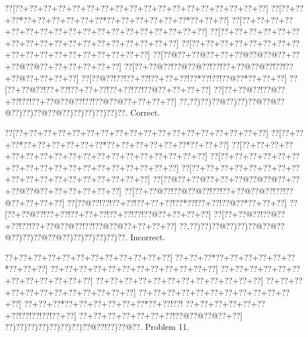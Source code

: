 \documentclass[a5paper]{article}
\begin{document}
\begin{center}
{\goo
\0??[\0??+\0??+\0??+\0??+\0??+\0??+\0??+\0??+\0??+\0??+\0??+\0??+\0??+\0??+\0??+\0??+\0??+\0??]
\0??[\0??+\0??+\0??*\0??+\0??+\0??+\0??+\0??+\0??*\0??+\0??+\0??+\0??+\0??+\0??*\0??+\0??+\0??]
\0??[\0??+\0??+\0??+\0??+\0??+\0??+\0??+\0??+\0??+\0??+\0??+\0??+\0??+\0??+\0??+\0??+\0??+\0??]
\0??[\0??+\0??+\0??+\0??+\0??+\0??+\0??+\0??+\0??+\0??+\0??+\0??+\0??+\0??+\0??+\0??+\0??+\0??]
\0??[\0??+\0??+\0??+\0??+\0??+\0??+\0??+\0??+\0??+\0??+\0??+\0??+\0??+\0??+\0??+\0??+\0??+\0??]
\0??[\0??@\0??+\0??@\0??+\0??+\0??@\0??@\0??@\0??+\0??+\0??@\0??@\0??+\0??+\0??+\0??+\0??+\0??]
\0??[\0??+\0??@\0??!\0??@\0??@\0??!\0??!\0??+\0??@\0??@\0??!\0??!\0??+\0??@\0??+\0??+\0??+\0??]
\0??[\0??@\0??!\0??!\0??+\0??!\0??+\0??+\0??!\0??*\0??!\0??!\0??@\0??*\0??+\0??+\0??]
\0??[\0??+\0??@\0??!\0??+\0??!\0??+\0??+\0??!\0??+\0??!\0??!\0??@\0??+\0??+\0??+\0??]
\0??[\0??+\0??@\0??!\0??@\0??+\0??!\0??!\0??+\0??@\0??@\0??!\0??!\0??@\0??@\0??+\0??+\0??+\0??]
\0??,\0??)\0??)\0??@\0??)\0??)\0??@\0??@\0??@\0??)\0??)\0??@\0??@\0??)\0??)\0??)\0??)\0??)\0??.
}
Correct. 

\end{center}
\begin{center}
{\goo
\0??[\0??+\0??+\0??+\0??+\0??+\0??+\0??+\0??+\0??+\0??+\0??+\0??+\0??+\0??+\0??+\0??+\0??+\0??]
\0??[\0??+\0??+\0??*\0??+\0??+\0??+\0??+\0??+\0??*\0??+\0??+\0??+\0??+\0??+\0??*\0??+\0??+\0??]
\0??[\0??+\0??+\0??+\0??+\0??+\0??+\0??+\0??+\0??+\0??+\0??+\0??+\0??+\0??+\0??+\0??+\0??+\0??]
\0??[\0??+\0??+\0??+\0??+\0??+\0??+\0??+\0??+\0??+\0??+\0??+\0??+\0??+\0??+\0??+\0??+\0??+\0??]
\0??[\0??+\0??+\0??+\0??+\0??+\0??+\0??+\0??+\0??+\0??+\0??+\0??+\0??+\0??+\0??+\0??+\0??+\0??]
\0??[\0??@\0??+\0??@\0??+\0??+\0??@\0??@\0??@\0??+\0??+\0??@\0??@\0??+\0??+\0??+\0??+\0??+\0??]
\0??[\0??+\0??@\0??!\0??@\0??@\0??!\0??!\0??+\0??@\0??@\0??!\0??!\0??@\0??+\0??+\0??+\0??]
\0??[\0??@\0??!\0??!\0??+\0??!\0??+\0??+\0??!\0??*\0??!\0??+\0??!\0??@\0??*\0??+\0??+\0??]
\0??[\0??+\0??@\0??!\0??+\0??!\0??+\0??+\0??!\0??+\0??!\0??!\0??@\0??+\0??+\0??+\0??]
\0??[\0??+\0??@\0??!\0??@\0??+\0??!\0??!\0??+\0??@\0??@\0??!\0??!\0??@\0??@\0??+\0??+\0??+\0??]
\0??,\0??)\0??)\0??@\0??)\0??)\0??@\0??@\0??@\0??)\0??)\0??@\0??@\0??)\0??)\0??)\0??)\0??)\0??.
}
Incorrect. 

\end{center}
\newpage
\begin{center}
{\goo
\0??+\0??+\0??+\0??+\0??+\0??+\0??+\0??+\0??+\0??+\0??+\0??]
\0??+\0??+\0??*\0??+\0??+\0??+\0??+\0??+\0??*\0??+\0??+\0??]
\0??+\0??+\0??+\0??+\0??+\0??+\0??+\0??+\0??+\0??+\0??+\0??]
\0??+\0??+\0??+\0??+\0??+\0??+\0??+\0??+\0??+\0??+\0??+\0??]
\0??+\0??+\0??+\0??+\0??+\0??+\0??+\0??+\0??+\0??+\0??+\0??]
\0??+\0??+\0??+\0??+\0??+\0??+\0??+\0??+\0??+\0??+\0??+\0??]
\0??+\0??+\0??+\0??+\0??+\0??+\0??+\0??+\0??+\0??+\0??+\0??]
\0??+\0??+\0??*\0??+\0??+\0??+\0??+\0??+\0??*\0??+\0??!\0??!
\0??+\0??+\0??+\0??+\0??+\0??+\0??!\0??!\0??!\0??!\0??+\0??]
\0??+\0??+\0??+\0??+\0??+\0??+\0??!\0??@\0??@\0??@\0??+\0??]
\0??)\0??)\0??)\0??)\0??)\0??)\0??)\0??@\0??!\0??)\0??@\0??.
}
Problem 11.

\end{center}
\end{document}
